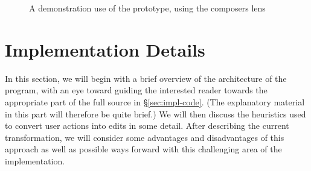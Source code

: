 \begin{figure}
    \centering
    \hfil
    \vspace{4ex}

    \hfil
    \vspace{4ex}

    \hfil
    \vspace{4ex}

    \hfil
    \vspace{4ex}

    \caption{A demonstration use of the prototype, using the composers lens}
    \label{fig:prototype-screenshots}
\end{figure}

\section{Implementation Details}
\label{sec:impl-details}
\label{sec:impl-parsing}
\label{sec:parsing}
In this section, we will begin with a brief overview of the architecture of
the program, with an eye toward guiding the interested reader towards the
appropriate part of the full source in \S\ref{sec:impl-code}. (The
explanatory material in this part will therefore be quite brief.) We will
then discuss the heuristics used to convert user actions into edits in some
detail. After describing the current transformation, we will consider some
advantages and disadvantages of this approach as well as possible ways
forward with this challenging area of the implementation.

